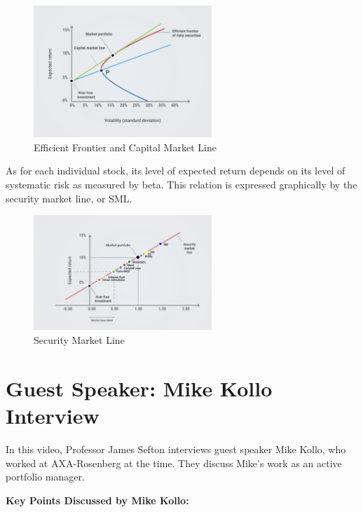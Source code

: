 \begin{figure}[H]
    \centering
    \includegraphics[width=0.6\textwidth]{img/6.6.png}
    \caption{Efficient Frontier and Capital Market Line}
    \label{fig:capm_graph_2}
\end{figure}

As for each individual stock, its level of expected return depends on its level of systematic risk as measured by beta. This relation is expressed graphically by the security market line, or SML.

\begin{figure}[H]
    \centering
    \includegraphics[width=0.6\textwidth]{img/6.7.png}
    \caption{Security Market Line}
    \label{fig:security_market_line}
\end{figure}


\section{Guest Speaker: Mike Kollo Interview}
In this video, Professor James Sefton interviews guest speaker Mike Kollo, who worked at AXA-Rosenberg at the time. They discuss Mike's work as an active portfolio manager.

\noindent \textbf{Key Points Discussed by Mike Kollo:}

